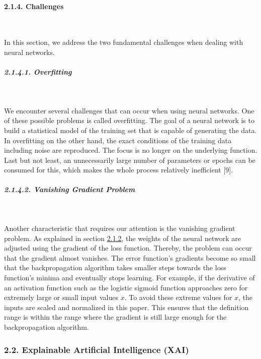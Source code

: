 \documentclass[
]{article}
\begin{document}
\newpage

\hypertarget{challenges}{%
\paragraph{2.1.4. Challenges}\label{challenges}}

~

In this section, we address the two fundamental challenges when dealing
with neural networks.

\hypertarget{overfitting}{%
\subparagraph{2.1.4.1. Overfitting}\label{overfitting}}

~

We encounter several challenges that can occur when using neural
networks. One of these possible problems is called overfitting. The goal
of a neural network is to build a statistical model of the training set
that is capable of generating the data. In overfitting on the other
hand, the exact conditions of the training data including noise are
reproduced. The focus is no longer on the underlying function. Last but
not least, an unnecessarily large number of parameters or epochs can be
consumed for this, which makes the whole process relatively inefficient
{[}9{]}.

\hypertarget{vanishing_gradient}{%
\subparagraph{2.1.4.2. Vanishing Gradient
Problem}\label{vanishing_gradient}}

~

Another characteristic that requires our attention is the vanishing
gradient problem. As explained in section
\protect\hyperlink{backprogation_algorithm}{2.1.2}, the weights of the
neural network are adjusted using the gradient of the loss function.
Thereby, the problem can occur that the gradient almost vanishes. The
error function's gradients become so small that the backpropagation
algorithm takes smaller steps towards the loss function's minima and
eventually stops learning. For example, if the derivative of an
activation function such as the logistic sigmoid function approaches
zero for extremely large or small input values \(x\). To avoid these
extreme values for \(x\), the inputs are scaled and normalized in this
paper. This ensures that the definition range is within the range where
the gradient is still large enough for the backpropagation algorithm.

\newpage

\hypertarget{xai}{%
\subsubsection{2.2. Explainable Artificial Intelligence
(XAI)}\label{xai}}
\end{document}
